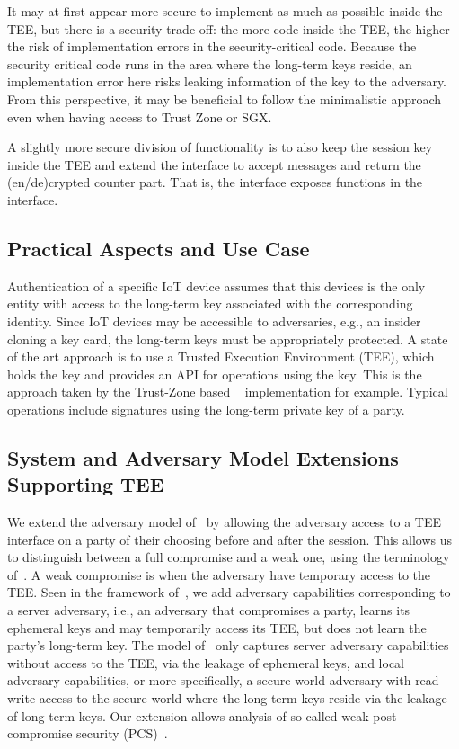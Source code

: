 \documentclass[runningheads]{llncs}
\begin{document}
It may at first appear more secure to implement as much as possible inside the
TEE, but there is a security trade-off: the more code inside the TEE,
the higher the risk of implementation errors in the security-critical code.
%
Because the security critical code runs in the area where the long-term keys
reside, an implementation error here risks leaking information of the key to the
adversary.
%
From this perspective, it may be beneficial to follow the minimalistic approach
even when having access to Trust Zone or SGX.
%

A slightly more secure division of functionality is to also keep the
session key inside
the TEE and extend the interface to accept messages and return the
(en/de)crypted counter part.
%
That is, the interface exposes \mAead{} functions in the interface.
%

\subsection{Practical Aspects and Use Case}
\label{sec:TEE:useCase}
Authentication of a specific IoT device assumes that this devices is the only
entity with access to the long-term key associated with the corresponding
identity.
%
Since IoT devices may be accessible to adversaries, e.g., an insider cloning a
key card, the long-term keys must be appropriately protected.
%
A state of the art approach is to use a Trusted Execution Environment (TEE),
which holds the key and provides an API for operations using the key.
%
This is the approach taken by the
Trust-Zone based \mMuEdhoc{}~\cite{DBLP:conf/codaspy/Hristozov0XFLS21}
implementation for example.
%
Typical operations include signatures using the long-term private key of a
party.
%

\subsection{System and Adversary Model Extensions Supporting TEE}
\label{sec:TEE:advModel}
%
We extend the adversary model of~\cite{Norr21} by allowing the adversary
access to a TEE interface on a party of their choosing before and after the
\mEdhoc{} session.
%
This allows us to distinguish between a full compromise and a weak one, using
the terminology of~\cite{DBLP:conf/csfw/Cohn-GordonCG16}.
%
A weak compromise is when the adversary have temporary access to the TEE.
%
Seen in the framework of~\cite{DBLP:conf/icics/XuZRWTZ20}, we add adversary
capabilities corresponding to a server adversary, i.e., an adversary that
compromises a party, learns its ephemeral keys and may temporarily access its
TEE, but does not learn the party's long-term key.
%
The model of~\cite{Norr21} only captures server adversary capabilities without
access to the TEE, via the leakage of ephemeral keys, and local adversary
capabilities, or more specifically, a secure-world adversary with read-write
access to the
secure world where the long-term keys reside via the leakage of long-term keys.
%
Our extension allows analysis of so-called weak post-compromise security
(PCS)~\cite{DBLP:conf/csfw/Cohn-GordonCG16}.
%
\end{document}
